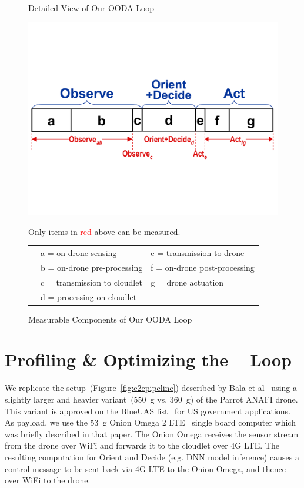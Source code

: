 \begin{figure}
	\caption{\small Detailed View of Our OODA Loop}
	\label{fig:ooda-loop}
	\vspace{0.2in}
	\centering
	\includegraphics[width=0.9\linewidth]{FIGS/fig-ooda-nomenclature.pdf}
	\begin{captext}
		\centering Only items in \textcolor{red}{red} above can be measured.
		\flushleft
		\begin{tabular}{lll}
			\phantom{00} & a = on-drone sensing & e = transmission to drone\\
			\phantom{00} & b = on-drone pre-processing & f = on-drone post-processing\\
			\phantom{00} & c = transmission to cloudlet & g = drone actuation\\
			\phantom{00} & d = processing on cloudlet\\
		\end{tabular}
	\end{captext}
	\vspace{-0.1in}
	\caption{\small Measurable Components of Our OODA Loop}
	\label{fig:nomenclature}

\end{figure}

\section{Profiling \& Optimizing the \ooda~  Loop}
\label{sec:e2e-latency}

We replicate the setup~(Figure~\ref{fig:e2epipeline}) described by
Bala et al~\cite{Bala2023} using a slightly larger and heavier
variant~(550~g vs. 360~g) of the Parrot ANAFI drone. This variant is
approved on the BlueUAS list~\cite{BlueUAS2024} for US government
applications. As payload, we use the 53~g Onion Omega 2
LTE~\cite{Omega2023} single board computer which was briefly described
in that paper. The Onion Omega receives the sensor stream from the
drone over WiFi and forwards it to the cloudlet over 4G LTE.  The resulting
computation for Orient and Decide (e.g. DNN model
inference) causes a control message to be sent back via 4G LTE
to the Onion Omega, and thence over WiFi to the drone.

